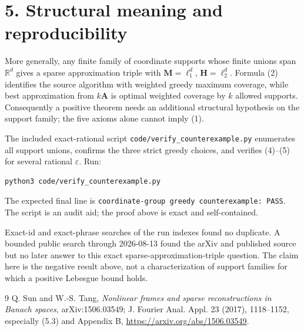 \documentclass[10pt]{article}
\newcommand{\R}{\mathbb R}
\newcommand{\A}{\mathbf A}
\newcommand{\M}{\mathbf M}
\newcommand{\Hh}{\mathbf H}
\begin{document}
\section*{5. Structural meaning and reproducibility}

More generally, any finite family of coordinate supports whose finite unions
span $\R^d$ gives a sparse approximation triple with
$\M=\ell_1^d$, $\Hh=\ell_2^d$.  Formula (2) identifies the source algorithm
with weighted greedy maximum coverage, while best approximation from $k\A$
is optimal weighted coverage by $k$ allowed supports.  Consequently a
positive theorem needs an additional structural hypothesis on the support
family; the five axioms alone cannot imply (1).

The included exact-rational script
\texttt{code/verify\_counterexample.py} enumerates all support unions,
confirms the three strict greedy choices, and verifies (4)--(5) for several
rational $\varepsilon$.  Run:
\begin{verbatim}
python3 code/verify_counterexample.py
\end{verbatim}
The expected final line is
\texttt{coordinate-group greedy counterexample: PASS}.  The script is an
audit aid; the proof above is exact and self-contained.

Exact-id and exact-phrase searches of the run indexes found no duplicate.  A
bounded public search through 2026-08-13 found the arXiv and published source
but no later answer to this exact sparse-approximation-triple question.  The
claim here is the negative result above, not a characterization of support
families for which a positive Lebesgue bound holds.

\begin{thebibliography}{9}
Q. Sun and W.-S. Tang,
\emph{Nonlinear frames and sparse reconstructions in Banach spaces},
arXiv:1506.03549; J. Fourier Anal. Appl. 23 (2017), 1118--1152,
especially (5.3) and Appendix B,
\url{https://arxiv.org/abs/1506.03549}.
\end{thebibliography}
\end{document}
